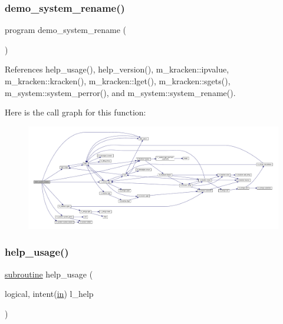 \subsubsection{\texorpdfstring{demo\+\_\+system\+\_\+rename()}{demo\_system\_rename()}}
{\footnotesize\ttfamily program demo\+\_\+system\+\_\+rename (\begin{DoxyParamCaption}{ }\end{DoxyParamCaption})}



References help\+\_\+usage(), help\+\_\+version(), m\+\_\+kracken\+::ipvalue, m\+\_\+kracken\+::kracken(), m\+\_\+kracken\+::lget(), m\+\_\+kracken\+::sgets(), m\+\_\+system\+::system\+\_\+perror(), and m\+\_\+system\+::system\+\_\+rename().

Here is the call graph for this function\+:
\nopagebreak
\begin{figure}[H]
\begin{center}
\leavevmode
\includegraphics[width=350pt]{__mv_8f90_aad99fde3e962ae73c9d6bc3825b8ca79_cgraph}
\end{center}
\end{figure}
\mbox{\label{__mv_8f90_a3e09a3b52ee8fb04eeb93fe5761626a8}} 
\subsubsection{\texorpdfstring{help\+\_\+usage()}{help\_usage()}}
{\footnotesize\ttfamily \hyperlink{M__stopwatch_83_8txt_acfbcff50169d691ff02d4a123ed70482}{subroutine} help\+\_\+usage (\begin{DoxyParamCaption}\item[{logical, intent(\hyperlink{M__journal_83_8txt_afce72651d1eed785a2132bee863b2f38}{in})}]{l\+\_\+help }\end{DoxyParamCaption})}



